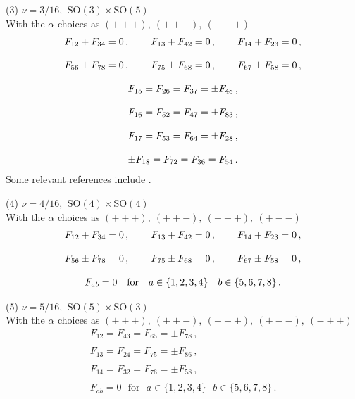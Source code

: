 \documentclass[a4paper,11pt]{article}
\begin{document}
(3) $\nu={3/16}$,  $~\mbox{SO}(3)\times\mbox{SO}(5)$\\
With the $\alpha$ choices as  $(+++),~(++-),~(+-+)$
\begin{equation}
\begin{array}{lll}
F_{12}+F_{34}=0\,,~~&~~F_{13}+F_{42}=0\,,~~&~~F_{14}+F_{23}=0\,,\\
{}&{}&{}\\
F_{56}\pm F_{78}=0\,,~~&~~F_{75}\pm F_{68}=0\,,~~&~~F_{67}\pm F_{58}=0\,,\\
{}&{}&{}\\
\multicolumn{3}{c}{F_{15}=F_{26}=F_{37}=\pm F_{48}\,,}\\
{}&{}&{}\\
\multicolumn{3}{c}{F_{16}=F_{52}=F_{47}=\pm F_{83}\,,}\\
{}&{}&{}\\
\multicolumn{3}{c}{F_{17}=F_{53}=F_{64}=\pm F_{28}\,,}\\
{}&{}&{}\\
\multicolumn{3}{c}{\pm F_{18}=F_{72}=F_{36}=F_{54}\,.}
\end{array}
\end{equation}
Some relevant references include \cite{Papadopoulos:1997dg,Hiraoka:2002wm}.
\newpage




(4) $\nu={4/16}$,  $~\mbox{SO}(4)\times\mbox{SO}(4)$\\
With the $\alpha$ choices as  $(+++),~(++-),~(+-+),~(+--)$
\begin{equation}
\begin{array}{lll}
F_{12}+F_{34}=0\,,~~&~~F_{13}+F_{42}=0\,,~~&~~F_{14}+F_{23}=0\,,\\
{}&{}&{}\\
F_{56}\pm F_{78}=0\,,~~&~~F_{75}\pm F_{68}=0\,,~~&~~F_{67}\pm F_{58}=0\,,\\
{}&{}&{}\\
\multicolumn{3}{c}{F_{ab}=0~~~\mbox{for}~~~{a\in\{1,2,3,4\}}~~~{b\in\{5,6,7,8\}}\,.}
\end{array}
\end{equation}




(5) $\nu={5/16}$,  $~\mbox{SO}(5)\times\mbox{SO}(3)$\\
With the $\alpha$ choices as  $(+++),~(++-),~(+-+),~(+--),~(-++)$
\begin{equation}
\begin{array}{c}
F_{12}=F_{43}=F_{65}=\pm F_{78}\,,\\
{}\\
F_{13}=F_{24}=F_{75}=\pm F_{86}\,,\\
{}\\
F_{14}=F_{32}=F_{76}=\pm F_{58}\,,\\
{}\\
F_{ab}=0~~~\mbox{for}~~~{a\in\{1,2,3,4\}}~~~{b\in\{5,6,7,8\}}\,.
\end{array}
\end{equation}
\end{document}
